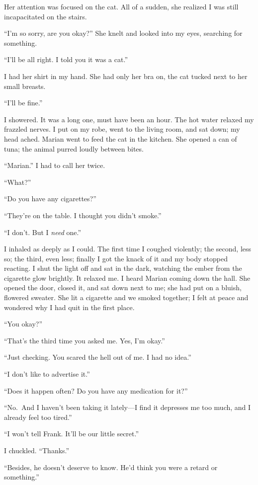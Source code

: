 Her attention was focused on the cat. All of a sudden, she realized I
was still incapacitated on the stairs.

``I'm so sorry, are you okay?'' She knelt and looked into my eyes,
searching for something.

``I'll be all right. I told you it was a cat.''

I had her shirt in my hand. She had only her bra on, the cat tucked next
to her small breasts.

``I'll be fine.''

I showered. It was a long one, must have been an hour. The hot water
relaxed my frazzled nerves. I put on my robe, went to the living room,
and sat down; my head ached. Marian went to feed the cat in the kitchen.
She opened a can of tuna; the animal purred loudly between bites.

``Marian.'' I had to call her twice.

``What?''

``Do you have any cigarettes?''

``They're on the table. I thought you didn't smoke.''

``I don't. But I \emph{need} one.''

I inhaled as deeply as I could. The first time I coughed violently; the
second, less so; the third, even less; finally I got the knack of it and
my body stopped reacting. I shut the light off and sat in the dark,
watching the ember from the cigarette glow brightly. It relaxed me. I
heard Marian coming down the hall. She opened the door, closed it, and
sat down next to me; she had put on a bluish, flowered sweater. She lit
a cigarette and we smoked together; I felt at peace and wondered why I
had quit in the first place.

``You okay?''

``That's the third time you asked me. Yes, I'm okay.''

``Just checking. You scared the hell out of me. I had no idea.''

``I don't like to advertise it.''

``Does it happen often? Do you have any medication for it?''

``No.~And I haven't been taking it lately---I find it depresses me too
much, and I already feel too tired.''

``I won't tell Frank. It'll be our little secret.''

I chuckled. ``Thanks.''

``Besides, he doesn't deserve to know. He'd think you were a retard or
something.''

